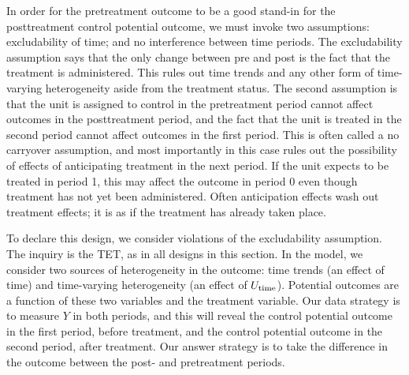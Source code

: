 \documentclass[
]{article}
\begin{document}
In order for the pretreatment outcome to be a good stand-in for the
posttreatment control potential outcome, we must invoke two assumptions:
excludability of time; and no interference between time periods. The
excludability assumption says that the only change between pre and post
is the fact that the treatment is administered. This rules out time
trends and any other form of time-varying heterogeneity aside from the
treatment status. The second assumption is that the unit is assigned to
control in the pretreatment period cannot affect outcomes in the
posttreatment period, and the fact that the unit is treated in the
second period cannot affect outcomes in the first period. This is often
called a no carryover assumption, and most importantly in this case
rules out the possibility of effects of anticipating treatment in the
next period. If the unit expects to be treated in period 1, this may
affect the outcome in period 0 even though treatment has not yet been
administered. Often anticipation effects wash out treatment effects; it
is as if the treatment has already taken place.

To declare this design, we consider violations of the excludability
assumption. The inquiry is the TET, as in all designs in this section.
In the model, we consider two sources of heterogeneity in the outcome:
time trends (an effect of time) and time-varying heterogeneity (an
effect of \(U_{\rm time}\)). Potential outcomes are a function of these
two variables and the treatment variable. Our data strategy is to
measure \(Y\) in both periods, and this will reveal the control
potential outcome in the first period, before treatment, and the control
potential outcome in the second period, after treatment. Our answer
strategy is to take the difference in the outcome between the post- and
pretreatment periods.
\end{document}
